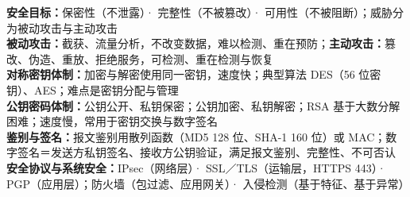 \documentclass[a4paper,11pt]{article}
\begin{document}

\begin{knowmap}
\textbf{安全目标：}保密性（不泄露）· 完整性（不被篡改）· 可用性（不被阻断）；威胁分为被动攻击与主动攻击\\[2pt]
\textbf{被动攻击：}截获、流量分析，不改变数据，难以检测、重在预防；\textbf{主动攻击：}篡改、伪造、重放、拒绝服务，可检测、重在检测与恢复\\[2pt]
\textbf{对称密钥体制：}加密与解密使用同一密钥，速度快；典型算法 DES（56 位密钥）、AES；难点是密钥分配与管理\\[2pt]
\textbf{公钥密码体制：}公钥公开、私钥保密；公钥加密、私钥解密；RSA 基于大数分解困难；速度慢，常用于密钥交换与数字签名\\[2pt]
\textbf{鉴别与签名：}报文鉴别用散列函数（MD5 128 位、SHA-1 160 位）或 MAC；数字签名＝发送方私钥签名、接收方公钥验证，满足报文鉴别、完整性、不可否认\\[2pt]
\textbf{安全协议与系统安全：}IPsec（网络层）· SSL／TLS（运输层，HTTPS 443）· PGP（应用层）；防火墙（包过滤、应用网关）· 入侵检测（基于特征、基于异常）
\end{knowmap}
\end{document}
